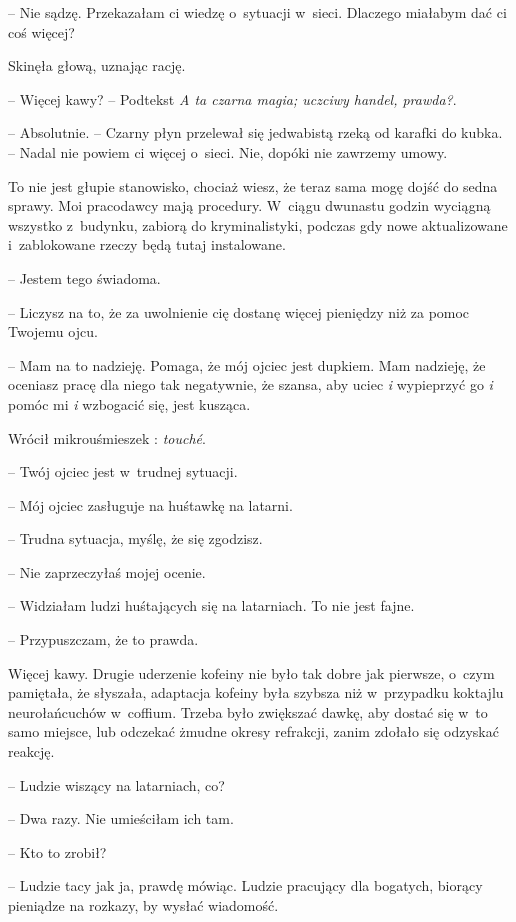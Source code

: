 \documentclass[oneside,polish,11pt,sfheadings]{mwbk}
\begin{document}
-- Nie sądzę. Przekazałam ci wiedzę o~sytuacji w~sieci. Dlaczego miałabym dać ci coś więcej?

Skinęła głową, uznając rację. 

-- Więcej kawy? -- Podtekst \textit{A ta
czarna magia; uczciwy handel, prawda?}.

-- Absolutnie. -- Czarny płyn przelewał się jedwabistą rzeką od karafki do
kubka. -- Nadal nie powiem ci więcej o~sieci. Nie, dopóki nie zawrzemy
umowy.

To nie jest głupie stanowisko, chociaż wiesz, że teraz sama mogę dojść
do sedna sprawy. Moi pracodawcy mają procedury. W~ciągu dwunastu godzin
wyciągną wszystko z~budynku, zabiorą do kryminalistyki, podczas gdy nowe
aktualizowane i~zablokowane rzeczy będą tutaj instalowane.

-- Jestem tego świadoma.

-- Liczysz na to, że za uwolnienie cię dostanę więcej pieniędzy niż za
pomoc Twojemu ojcu.

-- Mam na to nadzieję. Pomaga, że mój ojciec jest dupkiem. Mam nadzieję,
że oceniasz pracę dla niego tak negatywnie, że szansa, aby uciec
\textit{i} wypieprzyć go \textit{i} pomóc mi \textit{i} wzbogacić się, jest
kusząca.

Wrócił mikrouśmieszek : \textit{touché}. 

-- Twój ojciec jest w~trudnej
sytuacji.

-- Mój ojciec zasługuje na huśtawkę na latarni.

-- Trudna sytuacja, myślę, że się zgodzisz.

-- Nie zaprzeczyłaś mojej ocenie.

-- Widziałam ludzi huśtających się na latarniach. To nie jest fajne.

-- Przypuszczam, że to prawda.

Więcej kawy. Drugie uderzenie kofeiny nie było tak dobre jak pierwsze, o~czym pamiętała, że słyszała, adaptacja kofeiny była szybsza niż w~przypadku koktajlu neurołańcuchów w~coffium. Trzeba było zwiększać
dawkę, aby dostać się w~to samo miejsce, lub odczekać żmudne okresy
refrakcji, zanim zdołało się odzyskać reakcję.

-- Ludzie wiszący na latarniach, co?

-- Dwa razy. Nie umieściłam ich tam.

-- Kto to zrobił?

-- Ludzie tacy jak ja, prawdę mówiąc. Ludzie pracujący dla bogatych,
biorący pieniądze na rozkazy, by wysłać wiadomość.
\end{document}
